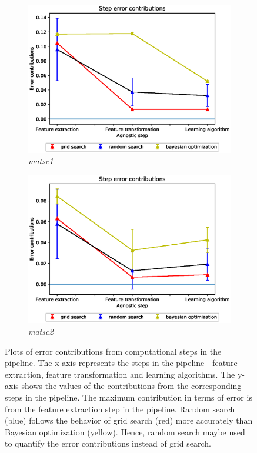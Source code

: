 \begin{figure}[ht!]
\begin{subfigure}{.5\textwidth}
  \includegraphics[scale=0.37]{img/EP/agnostic_error_steps_matsc_dataset1.eps}
  \caption{\textit{matsc1}}
  \label{fig:eq_steps_matsc1}
\end{subfigure}%
\begin{subfigure}{.5\textwidth}
  \centering
  \includegraphics[scale=0.37]{img/EP/agnostic_error_steps_matsc_dataset2.eps}
  \caption{\textit{matsc2}}
  \label{fig:eq_steps_matsc2}
\end{subfigure}
\caption{Plots of error contributions from computational steps in the pipeline. The x-axis represents the steps in the pipeline - feature extraction, feature transformation and learning algorithms. The y-axis shows the values of the contributions from the corresponding steps in the pipeline. The maximum contribution in terms of error is from the feature extraction step in the pipeline. Random search (blue) follows the behavior of grid search (red) more accurately than Bayesian optimization (yellow). Hence, random search maybe used to quantify the error contributions instead of grid search.}
\label{fig:eq_steps}
\end{figure}

